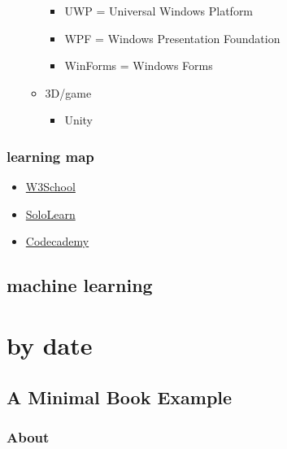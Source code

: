 \documentclass[
]{book}
\providecommand{\tightlist}{%
  \setlength{\itemsep}{0pt}\setlength{\parskip}{0pt}}
\theoremstyle{definition}
\theoremstyle{definition}
\theoremstyle{definition}
\theoremstyle{definition}
\theoremstyle{remark}
\begin{document}
\begin{itemize}
\begin{itemize}
    \begin{itemize}
    \tightlist
    \item
      UWP = Universal Windows Platform
    \item
      WPF = Windows Presentation Foundation
    \item
      WinForms = Windows Forms
    \end{itemize}
  \item
    3D/game

    \begin{itemize}
    \tightlist
    \item
      Unity
    \end{itemize}
  \end{itemize}
\end{itemize}

\hypertarget{learning-map-2}{%
\section{learning map}\label{learning-map-2}}

\begin{itemize}
\tightlist
\item
  \href{https://www.w3schools.com/}{W3School}
\item
  \href{https://www.sololearn.com/}{SoloLearn}
\item
  \href{https://www.codecademy.com/}{Codecademy}
\end{itemize}

\hypertarget{machine-learning}{%
\chapter{machine learning}\label{machine-learning}}

\hypertarget{part-by-date}{%
\part{by date}\label{part-by-date}}

\hypertarget{a-minimal-book-example}{%
\chapter{A Minimal Book Example}\label{a-minimal-book-example}}

\hypertarget{about}{%
\section{About}\label{about}}
\end{document}
